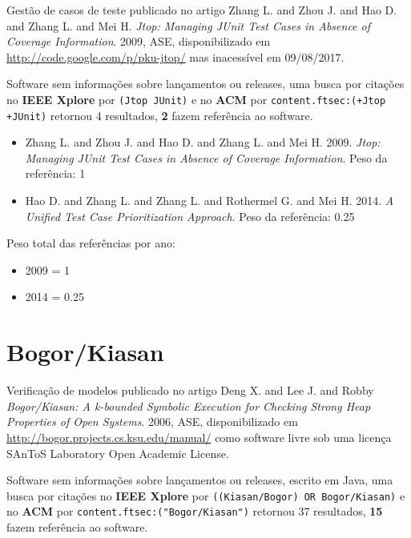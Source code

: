 Gestão de casos de teste
publicado no artigo
Zhang L. and Zhou J. and Hao D. and Zhang L. and Mei H.
{\it Jtop: Managing JUnit Test Cases in Absence of Coverage Information}.
2009,
ASE,
disponibilizado em \url{http://code.google.com/p/pku-jtop/}
mas inacessível em 09/08/2017.

Software sem informações sobre lançamentos ou releases,
uma busca por citações no {\bf IEEE Xplore} por
\texttt{(Jtop JUnit)}
e no {\bf ACM} por
\texttt{content.ftsec:(+Jtop +JUnit)}
retornou
4 resultados,
{\bf 2} fazem referência ao software.

\begin{itemize}
\item Zhang L. and Zhou J. and Hao D. and Zhang L. and Mei H.
      2009.
      {\it Jtop: Managing JUnit Test Cases in Absence of Coverage Information}.
      Peso da referência: 1
\item Hao D. and Zhang L. and Zhang L. and Rothermel G. and Mei H.
      2014.
      {\it A Unified Test Case Prioritization Approach}.
      Peso da referência: 0.25
\end{itemize}

Peso total das referências por ano:

\begin{itemize}
\item 2009 = 1
\item 2014 = 0.25
\end{itemize}


\section{Bogor/Kiasan}

Verificação de modelos
publicado no artigo
Deng X. and Lee J. and Robby
{\it Bogor/Kiasan: A k-bounded Symbolic Execution for Checking Strong Heap Properties of Open Systems}.
2006,
ASE,
disponibilizado em \url{http://bogor.projects.cs.ksu.edu/manual/}
como software livre
sob uma licença SAnToS Laboratory Open Academic License.

Software sem informações sobre lançamentos ou releases,
escrito em Java,
uma busca por citações no {\bf IEEE Xplore} por
\texttt{((Kiasan/Bogor) OR Bogor/Kiasan)}
e no {\bf ACM} por
\texttt{content.ftsec:("Bogor/Kiasan")}
retornou
37 resultados,
{\bf 15} fazem referência ao software.


